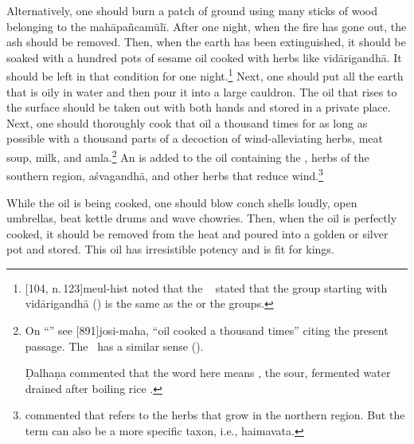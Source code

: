 \begin{translation}
    
Alternatively, one should burn a patch of ground using many sticks of
wood belonging to the \gls{mahāpañcamūlī}.  After one night, when the
fire has gone out, the ash should be removed.  Then, when the earth has been 
extinguished, it should be soaked with a hundred pots of sesame oil cooked with
herbs like \gls{vidārigandhā}.  It should be left in that condition
for one night.\footnote{[104, n.\,123]{meul-hist} noted
    that the \CS\  stated that the group
    starting with \gls{vidārigandhā} () is the same as
    the  or the  groups.} Next, one
    should put all the earth that is oily in water and then pour it into a
    large cauldron. %
    The oil that rises to the surface should be taken out with both
    hands and stored in a private place.  Next, one should thoroughly
    cook that oil a thousand times for as long as possible %
    with a thousand parts of a decoction of wind-alleviating herbs,
    meat soup, milk, and \gls{amla}.\footnote{On
        “” see
        [891]{josi-maha}, 
        “oil cooked a thousand times” citing the present passage.  The
        \CS\ has a similar sense ().
                    
        Ḍalhaṇa commented that the word  here means
, the sour, fermented water drained after boiling
rice \citep[423]{vulgate}.} An  is added to the oil
containing the , herbs of the
southern region, \gls{aśvagandhā}, and other herbs that reduce
wind.\footnote{ commented that
     refers to the herbs that grow in the northern
    region.  But the term can also be a more specific taxon, i.e.,
    \gls{haimavata}.}
    
While the oil is being cooked, one should blow conch shells loudly,
open umbrellas, beat kettle drums and wave chowries. Then, when the
oil is perfectly cooked, it should be removed from the heat and poured
into a golden or silver pot and stored. This
 oil has irresistible potency and
is fit for kings. 


\end{translation}
